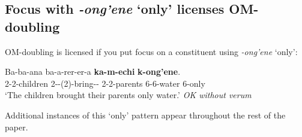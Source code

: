 \documentclass[output=paper]{langscibook}
\begin{document}


\subsection{Focus with \textit{-ong'ene} `only' licenses OM-doubling}

OM-doubling is licensed if you put focus on a constituent using \textit{-ong'ene} `only':

\ea %
\gll Ba-ba-ana ba-a-rer-er-a  \textbf{ka-m-echi} \textbf{k-ong’ene}. \\
2-2-children 2\Sm-\Pst-(2\Om)-bring-\Appl-\Fv{} 2-2-parents 6-6-water 6-only \\
\glt `The children brought their parents only water.' \textit{OK without verum}
\z 

\noindent Additional instances of this `only' pattern appear throughout the rest of the paper.




\end{document}
